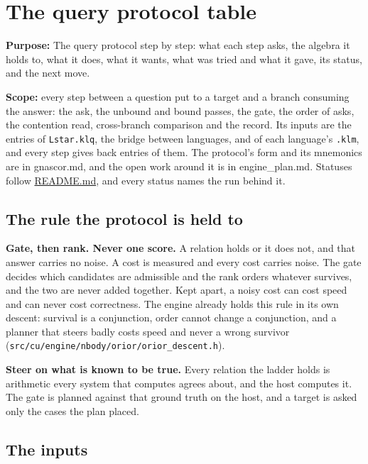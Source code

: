 \chapter{\texorpdfstring{The query protocol table}{The query protocol table}}
\label{chap:query-protocol-table}

\textbf{Purpose:} The query protocol step by step: what each step asks, the algebra it holds to, what it does, what it wants, what was tried and what it gave, its status, and the next move.

\textbf{Scope:} every step between a question put to a target and a branch consuming the answer: the ask, the unbound and bound passes, the gate, the order of asks, the contention read, cross-branch comparison and the record. Its inputs are the entries of \texttt{Lstar.\allowbreak{}klq}, the bridge between languages, and of each language's \texttt{.\allowbreak{}klm}, and every step gives back entries of them. The protocol's form and its mnemonics are in gnascor.md, and the open work around it is in engine\_\allowbreak{}plan.md. Statuses follow \hyperref[chap:readme]{README.md}, and every status names the run behind it.

\section{\texorpdfstring{The rule the protocol is held to}{The rule the protocol is held to}}

\textbf{Gate, then rank. Never one score.} A relation holds or it does not, and that answer carries no noise. A cost is measured and every cost carries noise. The gate decides which candidates are admissible and the rank orders whatever survives, and the two are never added together. Kept apart, a noisy cost can cost speed and can never cost correctness. The engine already holds this rule in its own descent: survival is a conjunction, order cannot change a conjunction, and a planner that steers badly costs speed and never a wrong survivor (\texttt{src/\allowbreak{}cu/\allowbreak{}engine/\allowbreak{}nbody/\allowbreak{}orior/\allowbreak{}orior\_\allowbreak{}descent.\allowbreak{}h}).

\textbf{Steer on what is known to be true.} Every relation the ladder holds is arithmetic every system that computes agrees about, and the host computes it. The gate is planned against that ground truth on the host, and a target is asked only the cases the plan placed.

\section{\texorpdfstring{The inputs}{The inputs}}

